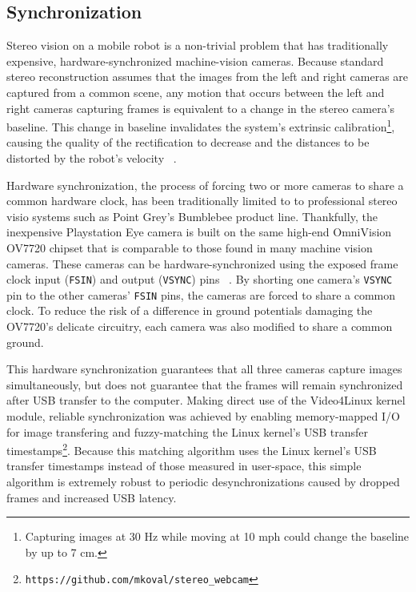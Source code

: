 \documentclass[twocolumn,11pt]{article}
\begin{document}
\subsection{Synchronization}
\label{sec:stereo-sync}
Stereo vision on a mobile robot is a non-trivial problem that has traditionally
expensive, hardware-synchronized machine-vision cameras. Because standard
stereo reconstruction assumes that the images from the left and right cameras
are captured from a common scene, any motion that occurs between the left and
right cameras capturing frames is equivalent to a change in the stereo camera's
baseline. This change in baseline invalidates the system's extrinsic
calibration\footnote{Capturing images at 30 Hz while moving at 10 mph could
change the baseline by up to 7 cm.}, causing the quality of the rectification
to decrease and the distances to be distorted by the robot's velocity
~\cite{unsync}.

Hardware synchronization, the process of forcing two or more cameras to share a
common hardware clock, has been traditionally limited to to professional stereo
visio systems such as Point Grey's Bumblebee product line.  Thankfully, the
inexpensive Playstation Eye camera is built on the same high-end OmniVision
OV7720 chipset that is comparable to those found in many machine vision
cameras. These cameras can be hardware-synchronized using the exposed frame
clock input (\texttt{FSIN}) and output (\texttt{VSYNC}) pins
~\cite{omnivision}. By shorting one camera's \texttt{VSYNC} pin to the other
cameras' \texttt{FSIN} pins, the cameras are forced to share a common clock. To
reduce the risk of a difference in ground potentials damaging the OV7720's
delicate circuitry, each camera was also modified to share a common ground.

This hardware synchronization guarantees that all three cameras capture images
simultaneously, but does not guarantee that the frames will remain synchronized
after USB transfer to the computer. Making direct use of the Video4Linux
kernel module, reliable synchronization was achieved by enabling memory-mapped
I/O for image transfering and fuzzy-matching the Linux kernel's USB transfer
timestamps\footnote{\texttt{https://github.com/mkoval/stereo\_webcam}}. Because
this matching algorithm uses the Linux kernel's USB transfer timestamps instead
of those measured in user-space, this simple algorithm is extremely robust to
periodic desynchronizations caused by dropped frames and increased USB latency.
\end{document}
